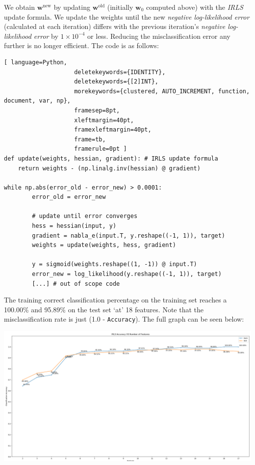 \documentclass[a4paper,11pt,oneside]{article}
\begin{document}
We obtain $\textbf{w}^{\textrm{new}}$ by updating $\textbf{w}^{\textrm{old}}$ (initially $\textbf{w}_0$ computed above) with the \textit{IRLS} update formula. We update the weights until the new \textit{negative log-likelihood error} (calculated at each iteration) differs with the previous iteration's \textit{negative log-likelihood error} by $1\times10^{-4}$ or less. Reducing the misclassification error any further is no longer efficient. The code is as follows:
\begin{lstlisting}[ language=Python,
                    deletekeywords={IDENTITY},
                    deletekeywords={[2]INT},
                    morekeywords={clustered, AUTO_INCREMENT, function, document, var, np},
                    framesep=8pt,
                    xleftmargin=40pt,
                    framexleftmargin=40pt,
                    frame=tb,
                    framerule=0pt ]
def update(weights, hessian, gradient): # IRLS update formula
    return weights - (np.linalg.inv(hessian) @ gradient)

while np.abs(error_old - error_new) > 0.0001:
        error_old = error_new

        # update until error converges
        hess = hessian(input, y)
        gradient = nabla_e(input.T, y.reshape((-1, 1)), target)
        weights = update(weights, hess, gradient)

        y = sigmoid(weights.reshape((1, -1)) @ input.T)
        error_new = log_likelihood(y.reshape((-1, 1)), target)
        [...] # out of scope code
\end{lstlisting}

The training correct classification percentage on the training set reaches a 100.00\% and 95.89\% on the test set `at' 18 features. Note that the misclassification rate is just (1.0 - \texttt{Accuracy}). The full graph can be seen below:

\hspace*{-2cm}\includegraphics[scale=0.35]{irls.png}
\end{document}
